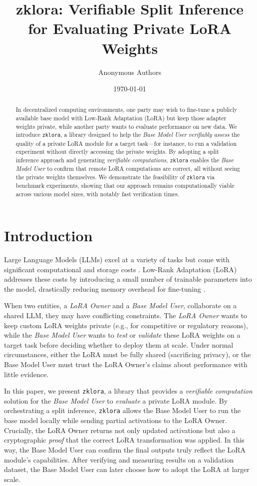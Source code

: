 \documentclass[11pt]{article}
\title{\textbf{zklora: Verifiable Split Inference for Evaluating Private LoRA Weights}}
\author{Anonymous Authors}
\date{\today}
\begin{document}
\maketitle

\begin{abstract}
In decentralized computing environments, one party may wish to fine-tune a publicly available base model with Low-Rank Adaptation (LoRA) but keep those adapter weights private, while another party wants to evaluate performance on new data. 
We introduce \texttt{zklora}, a library designed to help the \emph{Base Model User} \emph{verifiably assess} the quality of a private LoRA module for a target task---for instance, to run a validation experiment without directly accessing the private weights. 
By adopting a split inference approach and generating \emph{verifiable computations}, \texttt{zklora} enables the \emph{Base Model User} to confirm that remote LoRA computations are correct, all without seeing the private weights themselves. 
We demonstrate the feasibility of \texttt{zklora} via benchmark experiments, showing that our approach remains computationally viable across various model sizes, with notably fast verification times.
\end{abstract}

\section{Introduction}
Large Language Models (LLMs) excel at a variety of tasks but come with significant computational and storage costs \cite{brown2020language, devlin2018bert}. 
Low-Rank Adaptation (LoRA) \cite{hu2021lora} addresses these costs by introducing a small number of trainable parameters into the model, drastically reducing memory overhead for fine-tuning \cite{ding2022delta}. 

When two entities, a \emph{LoRA Owner} and a \emph{Base Model User}, collaborate on a shared LLM, they may have conflicting constraints. The \emph{LoRA Owner} wants to keep custom LoRA weights private (e.g., for competitive or regulatory reasons), while the \emph{Base Model User} wants to \emph{test} or \emph{validate} these LoRA weights on a target task before deciding whether to deploy them at scale. Under normal circumstances, either the LoRA must be fully shared (sacrificing privacy), or the Base Model User must trust the LoRA Owner’s claims about performance with little evidence.

In this paper, we present \texttt{zklora}, a library that provides a \emph{verifiable computation} solution for the \emph{Base Model User} to \emph{evaluate} a private LoRA module. By orchestrating a split inference, \texttt{zklora} allows the Base Model User to run the base model locally while sending partial activations to the LoRA Owner. Crucially, the LoRA Owner returns not only updated activations but also a cryptographic \emph{proof} that the correct LoRA transformation was applied. In this way, the Base Model User can confirm the final outputs truly reflect the LoRA module’s capabilities. After verifying and measuring results on a validation dataset, the Base Model User can later choose how to adopt the LoRA at larger scale.
\end{document}
